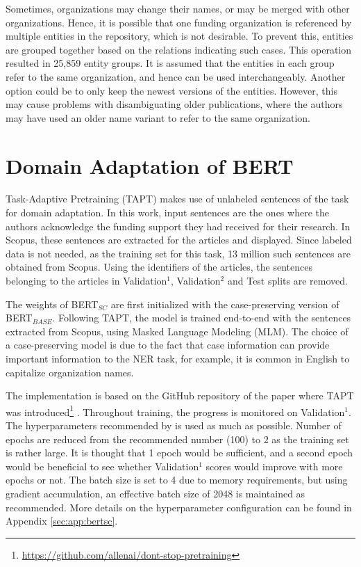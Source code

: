 \documentclass{report}
\theoremstyle{definition}
\theoremstyle{remark}
\begin{document}
Sometimes, organizations may change their names, or may be merged with other organizations. Hence, it is possible that one funding organization is referenced by multiple entities in the repository, which is not desirable. To prevent this, entities are grouped together based on the relations indicating such cases. This operation resulted in 25,859 entity groups. It is assumed that the entities in each group refer to the same organization, and hence can be used interchangeably. Another option could be to only keep the newest versions of the entities. However, this may cause problems with disambiguating older publications, where the authors may have used an older name variant to refer to the same organization.

\section{Domain Adaptation of BERT}
\label{sec:BERTExperiment}

Task-Adaptive Pretraining (TAPT) makes use of unlabeled sentences of the task for domain adaptation. In this work, input sentences are the ones where the authors acknowledge the funding support they had received for their research. In Scopus, these sentences are extracted for the articles and displayed. Since labeled data is not needed, as the training set for this task, 13 million such sentences are obtained from Scopus. Using the identifiers of the articles, the sentences belonging to the articles in Validation$^1$, Validation$^2$ and Test splits are removed.

The weights of BERT$_{SC}$ are first initialized with the case-preserving version of BERT$_{BASE}$. Following TAPT, the model is trained end-to-end with the sentences extracted from Scopus, using Masked Language Modeling (MLM). The choice of a case-preserving model is due to the fact that case information can provide important information to the NER task, for example, it is common in English to capitalize organization names. 

The implementation is based on the GitHub repository of the paper where TAPT was introduced\footnote{\url{https://github.com/allenai/dont-stop-pretraining}} \cite{DontStop}. Throughout training, the progress is monitored on Validation$^1$. The hyperparameters recommended by \cite{DontStop} is used as much as possible. Number of epochs are reduced from the recommended number (100) to 2 as the training set is rather large. It is thought that 1 epoch would be sufficient, and a second epoch would be beneficial to see whether Validation$^1$ scores would improve with more epochs or not. The batch size is set to 4 due to memory requirements, but using gradient accumulation, an effective batch size of 2048 is maintained as recommended. More details on the hyperparameter configuration can be found in Appendix \ref{sec:app:bertsc}.
\end{document}
